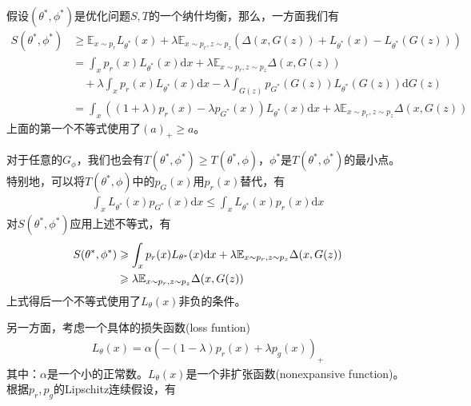             \begin{Proof}
            假设$(\theta^*,\phi^*)$是优化问题$S,T$的一个纳什均衡，那么，一方面我们有
            \begin{align*}
            S(\theta^*,\phi^*) &\geqslant \mathbb{E}_{x\sim p_r} L_{\theta^*}(x)+\lambda \mathbb{E}_{x\sim p_r,z\sim p_z}(\Delta(x,G(z))+L_{\theta^*}(x) - L_{\theta^*}(G(z)))\\
            &=\int_xp_r(x)L_{\theta^*}(x)\mathrm{d}x +\lambda\mathbb{E}_{x\sim p_r,z\sim p_z}\Delta(x,G(z)) \\
            & \quad+\lambda\int_x p_r(x)L_{\theta^*}(x)\mathrm{d}x - \lambda\int_{G(z)}p_{G^*}(G(z))L_{\theta^*}(G(z))\mathrm{d} G(z)\\
            &= \int_x((1+\lambda)p_r(x) - \lambda p_{G^*}(x) )L_{\theta^*}(x)\mathrm{d}x+\lambda \mathbb{E}_{x\sim p_r,z\sim p_z}\Delta(x,G(z))
            \end{align*}
            上面的第一个不等式使用了$(a)_+ \geqslant a$。
            \par
            对于任意的$G_\phi$，我们也会有$T(\theta^*,\phi^*) \geqslant T(\theta^*,\phi)$，$\phi^*$是$T(\theta^*,\phi^*)$的最小点。特别地，可以将$T(\theta^*,\phi)$中的$p_{G}(x)$用$p_r(x)$替代，有
            \begin{align*}
            \int_x L_{\theta^*} (x)p_{G^*}(x)\mathrm{d}x \leqslant \int _x L_{\theta^*}(x)p_r(x)\mathrm{d}x
            \end{align*}
            对$S(\theta^*,\phi^*)$应用上述不等式，有
            \begin{align}
            \label{LS-GAN:eq0}
            S(\theta^*,\phi^*) &\geqslant \int_x p_r(x)L_{\theta^*}(x)\mathrm{d}x + \lambda \mathbb{E}_{x\sim p_r,z\sim p_z} \Delta(x,G(z))\notag \\
            & \geqslant \lambda \mathbb{E}_{x\sim p_r,z\sim p_z} \Delta(x,G(z))
            \end{align}
            上式得后一个不等式使用了$L_\theta(x)$非负的条件。
            \par
            另一方面，考虑一个具体的损失函数(loss funtion)
            \begin{align}
            \label{LS-GAN:eq1:具体的损失函数}
            L_\theta(x) = \alpha(-(1-\lambda)p_r(x) + \lambda p_g(x))_+
            \end{align}
            其中：$\alpha$是一个小的正常数。$L_\theta(x)$是一个非扩张函数(nonexpansive function)。根据$p_r,p_g$的Lipschitz连续假设，有
            \begin{align}

\end{align}
\end{Proof}
